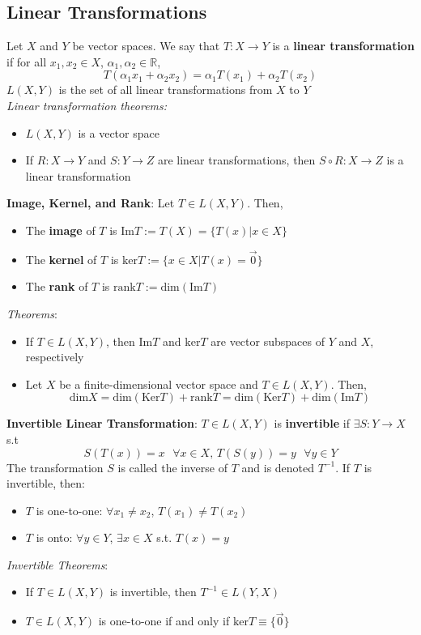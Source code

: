 \documentclass{article}
\newcommand{\R}{\mathbb{R}}
\begin{document}
\subsection{Linear Transformations}
Let $X$ and $Y$ be vector spaces. We say that $T:X\rightarrow Y$ is a \textbf{linear transformation} if for all $x_1,x_2\in X$, $\alpha_1,\alpha_2\in\R$,
\[
	T(\alpha_1 x_1 + \alpha_2 x_2) = \alpha_1 T(x_1) + \alpha_2 T(x_2)
\]
$L(X,Y)$ is the set of all linear transformations from $X$ to $Y$
\smallskip \\
\textit{Linear transformation theorems:}
\begin{itemize}
	\item $L(X,Y)$ is a vector space 
	\item If $R:X\rightarrow Y$ and $S:Y\rightarrow Z$ are linear transformations, then $S\circ R:X\rightarrow Z$ is a linear transformation
\end{itemize}
\smallskip
\textbf{Image, Kernel, and Rank}: Let $T\in L(X,Y)$. Then,
\begin{itemize}
	\item The \textbf{image} of $T$ is $\text{Im}T:=T(X)=\{T(x)|x\in X\}$
	\item The \textbf{kernel} of $T$ is $\text{ker}T:=\{x\in X|T(x)=\vec{0}\}$
	\item The \textbf{rank} of $T$ is $\text{rank}T:=\text{dim}(\text{Im}T)$
\end{itemize}
\textit{Theorems}:
\begin{itemize}
	\item If $T\in L(X,Y)$, then $\text{Im}T$ and $\text{ker}T$ are vector subspaces of $Y$ and $X$, respectively
	\item Let $X$ be a finite-dimensional vector space and $T\in L(X,Y)$. Then,
		\[
			\text{dim}X=\text{dim}(\text{Ker}T)+\text{rank}T=\text{dim}(\text{Ker}T)+\text{dim}(\text{Im}T)
		\]
\end{itemize}
\medskip
\textbf{Invertible Linear Transformation}: $T\in L(X,Y)$ is \textbf{invertible} if $\exists S:Y\rightarrow X$ s.t
\[
	S(T(x))=x\text{ }\forall x\in X\text{,    } T(S(y))=y\text{ }\forall y\in Y
\]
The transformation $S$ is called the inverse of $T$ and is denoted $T^{-1}$. If $T$ is invertible, then:
\begin{itemize}
	\item $T$ is one-to-one: $\forall x_1\neq x_2$, $T(x_1)\neq T(x_2)$
	\item $T$ is onto: $\forall y\in Y$, $\exists x\in X$ s.t. $T(x)=y$
\end{itemize}
\textit{Invertible Theorems}:
\begin{itemize}
	\item If $T\in L(X,Y)$ is invertible, then $T^{-1}\in L(Y,X)$
	\item $T\in L(X,Y)$ is one-to-one if and only if $\text{ker}T\equiv\{\vec{0}\}$
\end{itemize}
\end{document}
